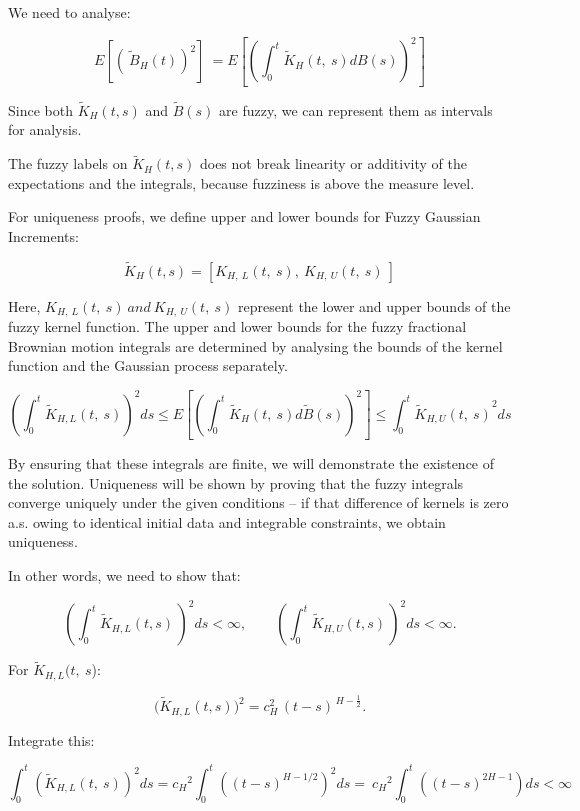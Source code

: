 \documentclass[12pt,a4paper]{report}
\numberwithin{equation}{section}
\begin{document}
We need to analyse:

\[E\left\lbrack \left( {\widetilde{\ B}}_{H}(t) \right)^{2} \right\rbrack\  = E\left\lbrack \left( \int_{0}^{t}{{\widetilde{K}}_{H}(t,\ s)dB(s)} \right)^{2} \right\rbrack\]

Since both \({\widetilde{K}}_{H}(t,s)\) and \(\widetilde{B}(s)\) are
fuzzy, we can represent them as intervals for analysis.

The fuzzy labels on \({\widetilde{K}}_{H}(t,s)\) does not break
linearity or additivity of the expectations and the integrals, because
fuzziness is above the measure level.

For uniqueness proofs, we define upper and lower bounds for Fuzzy
Gaussian Increments:

\[{\widetilde{K}}_{H}(t,s) = \left\lbrack K_{H,\ L}(t,\ s),\ K_{H,\ U}(t,\ s)\  \right\rbrack\]

Here, \(K_{H,\ L}(t,\ s)\ and\ K_{H,\ U}(t,\ s)\) represent the lower
and upper bounds of the fuzzy kernel function. The upper and lower bounds for the fuzzy
fractional Brownian motion integrals are determined by analysing the
bounds of the kernel function and the Gaussian process separately.

\[\left( \int_{0}^{t}{{\widetilde{K}}_{H,L}(t,\ s)} \right)^{2}ds \leq E\left\lbrack \left( \int_{0}^{t}{{\widetilde{K}}_{H}(t,\ s)d\widetilde{B}(s)} \right)^{2} \right\rbrack \leq \int_{0}^{t}{{\widetilde{K}}_{H,U}(t,\ s)}^{2}ds\]

By ensuring that these integrals are finite, we will demonstrate the
existence of the solution. Uniqueness will be shown by proving that the
fuzzy integrals converge uniquely under the given conditions -- if that
difference of kernels is zero a.s. owing to identical initial data and
integrable constraints, we obtain uniqueness.

In other words, we need to show that:

\[
\left(\int_{0}^{t}\widetilde{K}_{H,L}(t,s)\,\right)^{2}ds < \infty,
\qquad
\left(\int_{0}^{t}\widetilde{K}_{H,U}(t,s)\,\right)^{2}ds < \infty.
\]


For \({\widetilde{K}}_{H,L}(t,\ s\)):

\[
\bigl(\widetilde{K}_{H,L}(t,s)\bigr)^{2}
= c_{H}^{2}\,(t-s)^{\,H-\frac12}.
\]


Integrate this:

\[\int_{0}^{t}\left( {\widetilde{K}}_{H,L}(t,\ s) \right)^{2}ds = {c_{H}}^{2}\int_{0}^{t}{\left( {(t - s)}^{H - 1/2}  \right)^{2}ds} = \ {c_{H}}^{2}\int_{0}^{t}{\left( {(t - s)}^{2H - 1} \right)ds < \infty}\]
\end{document}
